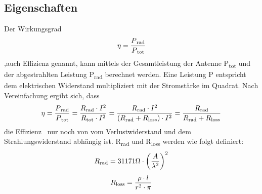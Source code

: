 \subsection{Eigenschaften\label{antennen:antennenEigenschaften}}
Der Wirkungsgrad
\begin{equation}
	\eta=\frac{P\textsubscript{rad}}{P\textsubscript{tot}}
	\label{antennen:Wirkungsgrad}
\end{equation}
,auch Effizienz genannt, kann mittels der Gesamtleistung der Antenne P\textsubscript{tot} und der abgestrahlten Leistung P\textsubscript{rad} berechnet werden. Eine Leistung P entspricht dem elektrischen Widerstand multipliziert mit der Stromstärke im Quadrat. Nach Vereinfachung ergibt sich, dass
\begin{equation}
	\eta=\frac{P\textsubscript{rad}}{P\textsubscript{tot}}=\frac{R\textsubscript{rad}\cdot{I^2}}{R\textsubscript{tot}\cdot{I^2}}=\frac{R\textsubscript{rad}\cdot{I^2}}{(R\textsubscript{rad}+R\textsubscript{loss})\cdot{I^2}}=\frac{R\textsubscript{rad}}{R\textsubscript{rad}+R\textsubscript{loss}}
	\label{antennen:Wirkungsgradkomplett}
\end{equation}
die Effizienz \texteta\ nur noch von vom Verlustwiderstand und dem Strahlungswiderstand abhängig ist. R\textsubscript{rad} und R\textsubscript{loss} werden wie folgt definiert:
\begin{equation}
	R\textsubscript{rad}=31171\Omega\cdot{\bigg(\frac{A}{\lambda^2}\bigg)^2}
	\label{antennen:Rrad}
\end{equation}
\begin{equation}
	R\textsubscript{loss}=\frac{\rho\cdot{l}}{r^2\cdot{\pi}}
	\label{antennen:Rloss}
\end{equation}

